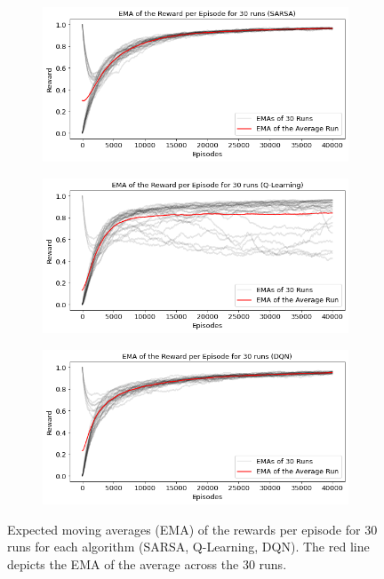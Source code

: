 \documentclass[conference]{IEEEtran}
\begin{document}
\begin{figure}[htbp!]
    \centering
    \begin{subfigure}[]{.45\textwidth}
        \includegraphics[width=\textwidth]{../figures/rewards_30_runs_sarsa.png}
        \caption{}
    \end{subfigure}
    \begin{subfigure}[]{.45\textwidth}
        \includegraphics[width=\textwidth]{../figures/rewards_30_runs_qlearning.png}
        \caption{}
    \end{subfigure}
    \begin{subfigure}[]{.45\textwidth}
        \includegraphics[width=\textwidth]{../figures/rewards_30_runs_dqn.png}
        \caption{}
    \end{subfigure}
    \caption{Expected moving averages (EMA) of the rewards per episode for 30 runs for each algorithm (SARSA, Q-Learning, DQN). The red line depicts the EMA of the average across the 30 runs.}
    \label{fig:30runs_reward}
\end{figure}
    
\end{document}
